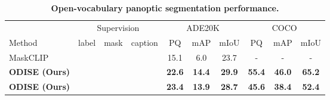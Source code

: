 \documentclass[10pt,twocolumn,letterpaper]{article}
\newcommand{\cmark}{\ding{51}}
\newcommand{\tablestyle}[2]{\setlength{\tabcolsep}{#1}\renewcommand{\arraystretch}{#2}\centering\small}
\newcommand{\ourmethod}{ODISE}
\begin{document}
\begin{table*}[t]
\vspace{-1em}
\tablestyle{8pt}{1.1}
\begin{tabular}{l|ccc|ccc|ccc}
                            & \multicolumn{3}{c|}{Supervision} & \multicolumn{3}{c|}{ADE20K}                     & \multicolumn{3}{c}{COCO}                      \\
Method                      & label    & mask     & caption   & PQ            & mAP           & mIoU          & PQ            & mAP           & mIoU          \\
\shline
MaskCLIP\cite{ding2022open} & \cmark   & \cmark   &           & 15.1          & 6.0           & 23.7          & -             & -             & -             \\
\textbf{\ourmethod{} (Ours)}   & \cmark   & \cmark   &           & \textbf{22.6}          & \textbf{14.4} & \textbf{29.9} & \textbf{55.4} & \textbf{46.0} & \textbf{65.2} \\
\hline
\hline
\textbf{\ourmethod{} (Ours)}   &          & \cmark   & \cmark    & \textbf{23.4} & \textbf{13.9} & \textbf{28.7} & \textbf{45.6} & \textbf{38.4} & \textbf{52.4}
\end{tabular}
\vspace{-1em}
\caption{
    \label{tab:panoptic}
    \textbf{Open-vocabulary panoptic segmentation performance.}
}
\vspace{-.5em}
\end{table*}
\end{document}
